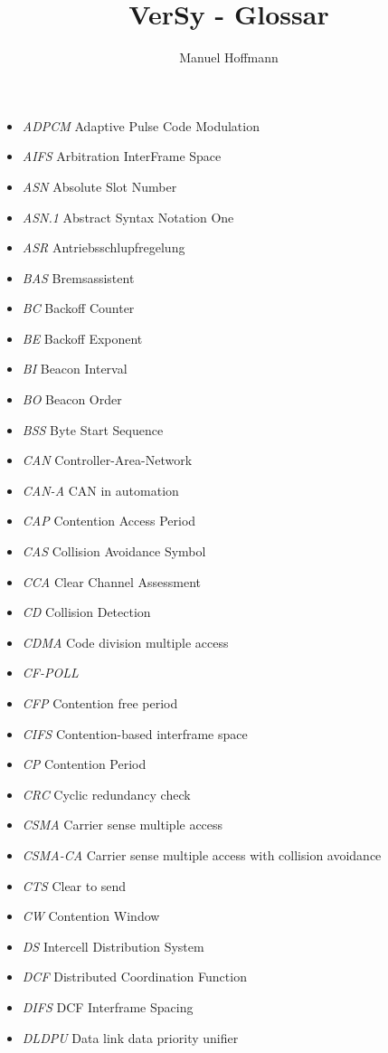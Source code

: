 \documentclass{article}
\title{VerSy - Glossar}
\author{Manuel Hoffmann}
\begin{document}
\begin{itemize}
	\item \emph{ADPCM} Adaptive Pulse Code Modulation
	\item \emph{AIFS} Arbitration InterFrame Space
	\item \emph{ASN} Absolute Slot Number
	\item \emph{ASN.1} Abstract Syntax Notation One
	\item \emph{ASR} Antriebsschlupfregelung
	\item \emph{BAS} Bremsassistent
	\item \emph{BC} Backoff Counter
	\item \emph{BE} Backoff Exponent
	\item \emph{BI} Beacon Interval
	\item \emph{BO} Beacon Order
	\item \emph{BSS} Byte Start Sequence
	\item \emph{CAN} Controller-Area-Network
	\item \emph{CAN-A} CAN in automation
	\item \emph{CAP} Contention Access Period
	\item \emph{CAS} Collision Avoidance Symbol
	\item \emph{CCA} Clear Channel Assessment
	\item \emph{CD} Collision Detection
	\item \emph{CDMA} Code division multiple access
	\item \emph{CF-POLL}
	\item \emph{CFP} Contention free period
	\item \emph{CIFS} Contention-based interframe space
	\item \emph{CP} Contention Period
	\item \emph{CRC} Cyclic redundancy check
	\item \emph{CSMA} Carrier sense multiple access
	\item \emph{CSMA-CA} Carrier sense multiple access with collision avoidance
	\item \emph{CTS} Clear to send
	\item \emph{CW} Contention Window
	\item \emph{DS} Intercell Distribution System
	\item \emph{DCF} Distributed Coordination Function
	\item \emph{DIFS} DCF Interframe Spacing
	\item \emph{DLDPU} Data link data priority unifier

\end{itemize}
\end{document}

